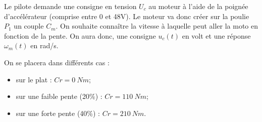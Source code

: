 \documentclass[10pt,fleqn]{article} %
\begin{document}
\begin{multicols}{2}
%
%
%
%
%
%
%
%

Le pilote demande une consigne en tension $U_c$ au moteur à l’aide de la poignée d’accélérateur (comprise entre 0 et 48V). Le moteur va donc créer sur la poulie $P_1$ un couple $C_m$. On souhaite connaître la vitesse à laquelle peut aller la moto en fonction de la pente. On aura donc, une consigne $u_c(t)$ en volt et une réponse $\omega_m (t)$ en rad/s.

On se placera dans différents cas :
\begin{itemize}
\item sur le plat : $Cr=\SI{0}{Nm}$;
\item sur une faible pente (20\%) : $Cr = \SI{110}{Nm}$;
\item sur une forte pente (40\%) : $Cr = \SI{210}{Nm}$.
\end{itemize}


\end{multicols}
\end{document}
